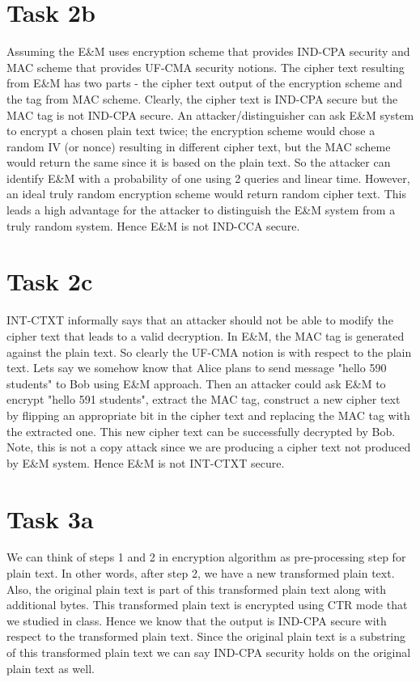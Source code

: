 \documentclass{article}
\begin{document}
    \section*{Task 2b}
    Assuming the E\&M uses encryption scheme that provides IND-CPA security and MAC scheme that provides UF-CMA security notions. The cipher text resulting from E\&M has two parts - the cipher text output of the encryption scheme and the tag from MAC scheme. Clearly, the cipher text is IND-CPA secure but the MAC tag is not IND-CPA secure. An attacker/distinguisher can ask E\&M system to encrypt a chosen plain text twice; the encryption scheme would chose a random IV (or nonce) resulting in different cipher text, but the MAC scheme would return the same since it is based on the plain text. So the attacker can identify E\&M with a probability of one using 2 queries and linear time. However, an ideal truly random encryption scheme would return random cipher text. This leads a high advantage for the attacker to distinguish the E\&M system from a truly random system. Hence E\&M is not IND-CCA secure.

    \section*{Task 2c}
    INT-CTXT informally says that an attacker should not be able to modify the cipher text that leads to a valid decryption. In E\&M, the MAC tag is generated against the plain text. So clearly the UF-CMA notion is with respect to the plain text. Lets say we somehow know that Alice plans to send message "hello 590 students" to Bob using E\&M approach. Then an attacker could ask E\&M to encrypt "hello 591 students", extract the MAC tag, construct a new cipher text by flipping an appropriate bit in the cipher text and replacing the MAC tag with the extracted one. This new cipher text can be successfully decrypted by Bob. Note, this is not a copy attack since we are producing a cipher text not produced by E\&M system. Hence E\&M is not INT-CTXT secure.

    \section*{Task 3a}
    We can think of steps 1 and 2 in encryption algorithm as pre-processing step for plain text. In other words, after step 2, we have a new transformed plain text. Also, the original plain text is part of this transformed plain text along with additional bytes. This transformed plain text is encrypted using CTR mode that we studied in class. Hence we know that the output is IND-CPA secure with respect to the transformed plain text. Since the original plain text is a substring of this transformed plain text we can say IND-CPA security holds on the original plain text as well.
\end{document}
